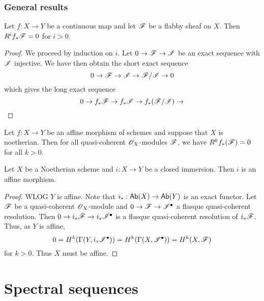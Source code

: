 \documentclass{memoir}
\begin{document}
\subsection{General results}
\begin{proposition}
    Let $f:X\to Y$ be a continuous map and let $\mathscr{F}$ be a flabby sheaf on $X$.
    Then $R^if_*\mathscr{F} = 0$ for $i>0$.
\end{proposition}
\begin{proof}
    We proceed by induction on $i$.
    Let $0\to \mathscr{F}\to \mathscr{I}$ be an exact sequence with $\mathscr{I}$ injective.
    We have then obtain the short exact sequence
    \begin{equation}
        0 \to \mathscr{F}\to \mathscr{I} \to \mathscr{F}/\mathscr{I} \to 0
    \end{equation}
    which gives the long exact sequence
    \begin{equation}
        0 \to f_*\mathscr{F}\to f_*\mathscr{I} \to f_*(\mathscr{F}/\mathscr{I}) \to 
    \end{equation}
\end{proof}
\begin{lemma}
    Let $f:X\to Y$ be an affine morphism of schemes and suppose that $X$ is noetherian.
    Then for all quasi-coherent $\mathscr{O}_X$-modules $\mathscr{F}$, we have $R^kf_*(\mathscr{F}) = 0$ for all $k>0$.
\end{lemma}
\begin{lemma}
    Let $X$ be a Noetherian scheme and $i:X\to Y$ be a closed immersion.
    Then $i$ is an affine morphism.
\end{lemma}
\begin{proof}
    WLOG $Y$ is affine.
    Note that $i_*:{\normalfont\mathsf{Ab}}(X)\to {\normalfont\mathsf{Ab}}(Y)$ is an exact functor.
    Let $\mathscr{F}$ be a quasi-coherent $\mathscr{O}_X$-module and $0\to \mathscr{F}\to \mathscr{I}^\bullet$ a flasque quasi-coherent resolution.
    Then $0 \to i_*\mathscr{F}\to i_*\mathscr{I}^\bullet$ is a flasque quasi-coherent resolution of $i_*\mathscr{F}$.
    Thus, as $Y$ is affine,
    \begin{equation}
        0 = H^k(\Gamma(Y,i_*\mathscr{I}^\bullet)) = H^k(\Gamma(X,\mathscr{I}^\bullet)) = H^k(X,\mathscr{F})
    \end{equation}
    for $k>0$.
    Thus $X$ must be affine.
\end{proof}
\chapter{Spectral sequences}
\end{document}

